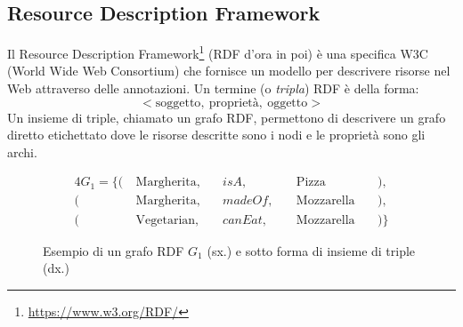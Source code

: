 \subsection[Resource Description Framework]{Resource Description Framework}
Il Resource Description Framework\footnote{\url{https://www.w3.org/RDF/}} (RDF d'ora in poi) è una specifica W3C (World Wide Web Consortium) che fornisce un modello per descrivere risorse nel Web attraverso delle annotazioni. Un termine (o \emph{tripla}) RDF è della forma:
\[ < \text{soggetto},\ \text{proprietà},\ \text{oggetto} > \]
Un insieme di triple, chiamato un grafo RDF, permettono di descrivere un grafo diretto etichettato dove le risorse descritte sono i nodi e le proprietà sono gli archi.
\begin{figure}[h]
    \begin{minipage}{0.3\linewidth}
        \centering
    \end{minipage}
    \hspace{5mm}
    \begin{minipage}{0.7\linewidth}
        \begin{alignat*}{4}
            G_1 = \{ (\  & \text{Margherita},\  &  & isA,      &  & \text{Pizza}        &  & ),  \\
            (\           & \text{Margherita},\  &  & madeOf,\  &  & \text{Mozzarella}\  &  & ),  \\
            (\           & \text{Vegetarian},\  &  & canEat,\  &  & \text{Mozzarella}\  &  & )\}
        \end{alignat*}
    \end{minipage}
    \caption{Esempio di un grafo RDF $G_1$ (sx.) e sotto forma di insieme di triple (dx.)}
\end{figure}

